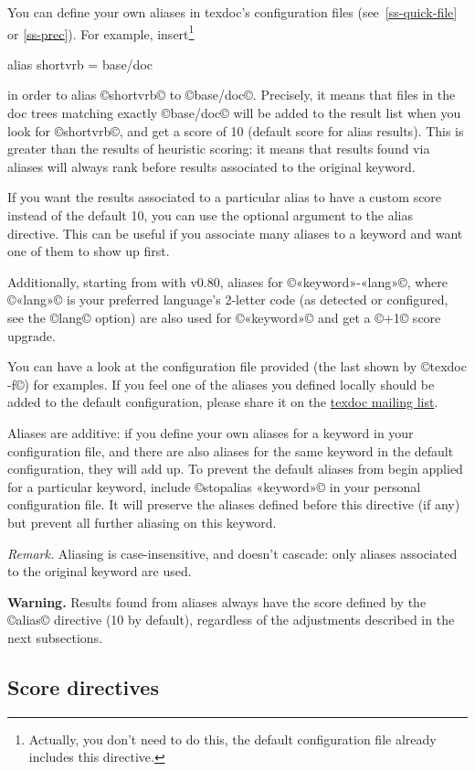 \documentclass[a4paper, oneside]{scrartcl}
\makeatletter
\newenvironment{htcode}{%
  \SaveVerbatim[samepage, gobble=2]{verbmat}%
  }{%
  \endSaveVerbatim
  \par\medskip\noindent\hspace*{\parindent}%
  \BUseVerbatim{verbmat}%
  \par\medskip\@endpetrue}
\newcommand\tdml{\href{http://lists.tug.org/texdoc}{texdoc mailing list}\xspace}
\makeatother
\begin{document}
You can define your own aliases in texdoc's configuration files
(see~\ref{ss-quick-file} or \ref{ss-prec}). For example,
insert\footnote{Actually, you don't need to do this, the default configuration
  file already includes this directive.}
\begin{htcode}
  alias shortvrb = base/doc
\end{htcode}
in order to alias ©shortvrb© to ©base/doc©. Precisely, it means that files in
the doc trees matching exactly ©base/doc© will be added to the result list
when you look for ©shortvrb©, and get a score of 10 (default score for alias
results). This is greater than the results of heuristic scoring: it means that
results found via aliases will always rank before results associated to the
original keyword.

If you want the results associated to a particular alias to have a custom
score instead of the default 10, you can use the optional argument to the
alias directive. This can be useful if you associate many aliases to
a keyword and want one of them to show up first.

Additionally, starting from with v0.80, aliases for ©«keyword»-«lang»©, where
©«lang»© is your preferred language's 2-letter code (as detected or
configured, see the ©lang© option) are also used for ©«keyword»© and get a
©+1© score upgrade.

You can have a look at the configuration file provided (the last shown by
©texdoc -f©) for examples.  If you feel one of the aliases you defined locally
should be added to the default configuration, please share it on the \tdml.

Aliases are additive: if you define your own aliases for a keyword in your
configuration file, and there are also aliases for the same keyword in the
default configuration, they will add up. To prevent the default aliases
from begin applied for a particular keyword, include ©stopalias «keyword»© in
your personal configuration file. It will preserve the aliases defined before
this directive (if any) but prevent all further aliasing on this keyword.

\textit{Remark.} Aliasing is case-insensitive, and doesn't cascade:
only aliases associated to the original keyword are used.

\textbf{Warning.} Results found from aliases always have the score defined by
the ©alias© directive (10 by default), regardless of the adjustments described
in the next subsections.

\subsection{Score directives}\label{ss-score}
\end{document}
